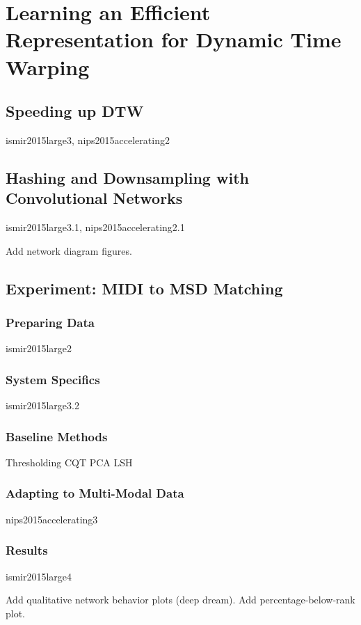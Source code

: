 \chapter{Learning an Efficient Representation for Dynamic Time Warping}
\label{ch:dhs}

\section{Speeding up DTW}

ismir2015large3, nips2015accelerating2

\section{Hashing and Downsampling with Convolutional Networks}

ismir2015large3.1, nips2015accelerating2.1

Add network diagram figures.

\section{Experiment: MIDI to MSD Matching}

\subsection{Preparing Data}

ismir2015large2

\subsection{System Specifics}

ismir2015large3.2

\subsection{Baseline Methods}

Thresholding CQT PCA
LSH

\subsection{Adapting to Multi-Modal Data}

nips2015accelerating3

\subsection{Results}

ismir2015large4

Add qualitative network behavior plots (deep dream).
Add percentage-below-rank plot.
